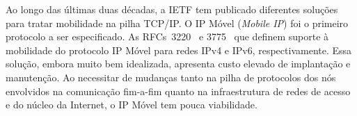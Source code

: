 \documentclass[	12pt, Times, openright, twoside, a4paper, english, brazil]{abntex2}
\newcommand{\bkc}[1]{{\color{blue}{#1}}} %
\newcommand{\bko}[1]{{\color{red}{#1}}} %
\begin{document}

Ao longo das últimas duas décadas, a IETF tem publicado diferentes soluções para tratar mobilidade na pilha TCP/IP. O IP Móvel (\textit{Mobile IP}) foi o primeiro protocolo a ser especificado. As RFCs~3220~\cite{rfc3220} e 3775~\cite{rfc3775} que definem suporte à mobilidade do protocolo IP Móvel para redes IPv4 e IPv6, respectivamente. Essa solução, embora muito bem idealizada, apresenta custo elevado de implantação e manutenção. Ao necessitar de mudanças tanto na pilha de protocolos dos nós envolvidos na comunicação fim-a-fim quanto na infraestrutura de redes de acesso e do núcleo da Internet, o IP Móvel tem pouca viabilidade. 

\end{document}
